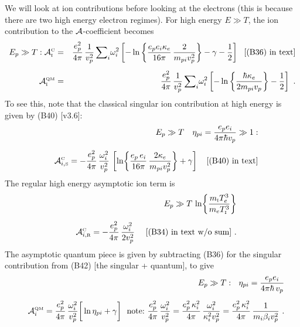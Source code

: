 \documentclass[preprint,12pt,eqsecnum,nofootinbib,amsmath,amssymb]{revtex4}
\newcommand{\smC}{{\rm\scriptscriptstyle C}}
\newcommand{\smI}{{\rm\scriptscriptstyle I}}
\newcommand{\smR}{{\rm\scriptscriptstyle R}}
\newcommand{\smS}{{\rm\scriptscriptstyle S}}
\newcommand{\smQM}{{\rm\scriptscriptstyle QM}}
\begin{document}
We will look at ion contributions before looking at the electrons
(this is because there are two high energy electron regimes).  For
high energy $E \gg T$, the ion contribution to the ${\cal
A}$-coefficient becomes
\begin{eqnarray}
  E_p \gg T :
  {\cal A}_\smI^\smC &=& 
  \frac{e_p^2}{4\pi}\, \frac{1}{v_p^2} \,
  {\sum}_i \omega_i^2 \left[
  -\ln\left\{\frac{e_p e_i \kappa_e}{16\pi}\, 
  \frac{2}{m_{pi} v_p^2} \right\} - \gamma - \frac{1}{2}
  \right] 
  ~~\text{[(B36) in text]}
\label{highIa}
\\[5pt]
  {\cal A}_\smI^\smQM &=& 
  \frac{e_p^2}{4\pi}\, \frac{1}{v_p^2} \,
  {\sum}_i \omega_i^2 \left[
  -\ln\left\{\frac{\hbar \kappa_e}{2 m_{pi} v_p} \right\}  - \frac{1}{2}
  \right] \ .
\label{highIb}
\end{eqnarray}
To see this, note that the classical singular ion contribution at high
energy is given by (B40) [v3.6]:
\begin{eqnarray}
  && E_p \gg T ~~~ \eta_{pi} = \frac{e_p e_i}{4\pi\hbar v_p} \gg 1:
\nonumber \\[5pt]
  &&
  {\cal A}^\smC_{i,\smS} 
  = 
  -\frac{e_p^2}{4\pi}\, \frac{\omega_i^2}{v_p^2}\,
  \left[
  \ln\!\left\{ \frac{e_p \,e_i}{16\pi}\,\frac{2 \kappa_e}{m_{p i}
    v_p^2} \right\} + \gamma 
  \right]
  ~~~\text{[(B40) in text]}
\end{eqnarray}
The regular high energy asymptotic ion term is
\begin{eqnarray}
  && E_p \gg T\,\ln\!\left\{ \frac{m_\smI T_e^3}{m_e T_\smI^3} \right\}
\nonumber \\[5pt]
  &&
  {\cal A}^\smC_{i,\smR} 
  =
  - \frac{e_p^2}{4\pi}\, \frac{\omega_i^2}{2 v_p^2} 
  ~~~\text{ [(B34) in text w/o sum]}
  \ .
\end{eqnarray}
The asymptotic quantum piece is given by subtracting (B36) for the
singular contribution from (B42) [the singular + quantum], to give
\begin{eqnarray}
  && E_p \gg T : ~~ \eta_{pi}=\frac{e_p e_i}{4\pi\hbar\,v_p}
\nonumber \\[5pt]
  &&
  {\cal A}^\smQM_i
  = 
  \frac{e_p^2}{4\pi}\,\frac{\omega_i^2}{v_p^2}\bigg[
  \ln \eta_{pi}  +\gamma \bigg] 
  ~~\text{note:}~
  \frac{e_p^2}{4\pi}\,\frac{\omega_i^2}{v_p^2}
  =
  \frac{e_p^2\, \kappa_i^2}{4\pi}\,\frac{\omega_i^2}{\kappa_i^2 v_p^2}
  =
  \frac{e_p^2\, \kappa_i^2}{4\pi}\,\frac{1}{m_i \beta_i v_p^2}
  \ .
\end{eqnarray}
\end{document}
